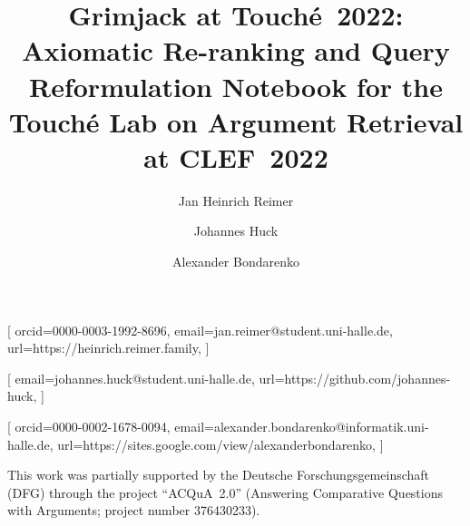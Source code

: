 \documentclass{ceurart}
\begin{document}

\title{%
  Grimjack at \texorpdfstring{Touch{\'e}~2022}{Touch{\'e} 2022}:\texorpdfstring{\\}{ }
  Axiomatic Re-ranking and Query Reformulation%
}
\title[mode=sub]{%
  Notebook for the Touché Lab on Argument Retrieval at CLEF\ 2022%
}

\author{Jan Heinrich Reimer}[
  orcid=0000-0003-1992-8696,
  email=jan.reimer@student.uni-halle.de,
  url=https://heinrich.reimer.family,
]
\author{Johannes Huck}[
  email=johannes.huck@student.uni-halle.de,
  url=https://github.com/johannes-huck,
]
\author{Alexander Bondarenko}[
  orcid=0000-0002-1678-0094,
  email=alexander.bondarenko@informatik.uni-halle.de,
  url=https://sites.google.com/view/alexanderbondarenko,
]

\address{%
  Martin-Luther-Universität Halle-Wittenberg,
  06099~Halle~(Saale), Germany
}



\maketitle








\begin{acknowledgments}
This work was partially supported by the Deutsche Forschungsgemeinschaft (DFG) through the project ``ACQuA~2.0'' (Answering Comparative Questions with Arguments; project number 376430233).
\end{acknowledgments}


\end{document}
